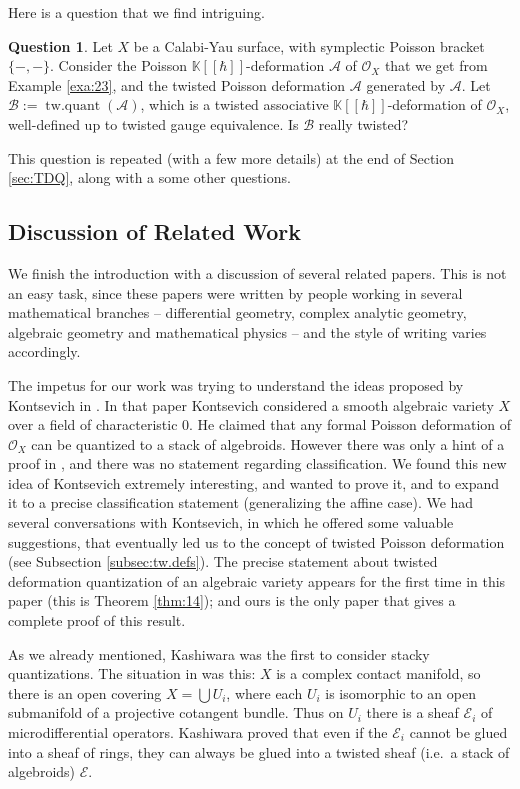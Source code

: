 \documentclass[a4paper, 10pt]{amsart}
\theoremstyle{definition}
\newtheorem{que}[equation]{Question}
\numberwithin{equation}{section}
\newcommand{\opn}{\operatorname}
\newcommand{\mcal}[1]{\mathcal{#1}}
\newcommand{\mbb}[1]{\mathbb{#1}}
\newcommand{\bsym}[1]{\boldsymbol{#1}}
\newcommand{\K}{\mbb{K}}
\newcommand{\OO}{\mcal{O}}
\newcommand{\gerbe}[1]{\bsym{\mcal{#1}}}
\begin{document}
Here is a question that we find intriguing. 

\begin{que}
Let $X$ be a Calabi-Yau surface, with symplectic Poisson bracket 
$\{ -,- \}$. Consider the Poisson $\K[[\hbar]]$-deformation 
$\mcal{A}$ of $\mcal{O}_X$ that we get from Example \ref{exa:23}, and the 
twisted Poisson deformation $\gerbe{A}$ generated by $\mcal{A}$.
Let $\gerbe{B} := \opn{tw{.}quant} (\gerbe{A})$,
which is a twisted associative $\K[[\hbar]]$-deformation 
of $\mcal{O}_X$, well-defined up to twisted gauge equivalence. Is
$\gerbe{B}$ really twisted? 
\end{que}

This question is repeated (with a few more details) at the end of Section
\ref{sec:TDQ}, along with a some other questions.


\subsection{Discussion of Related Work} \label{subsec:discuss}
We finish the introduction with a discussion of several related papers.
This is not an easy task, since these papers were written by people working in
several mathematical branches -- differential geometry, complex
analytic geometry, algebraic geometry and mathematical physics -- and the style
of writing varies accordingly.  

The impetus for our work was trying to understand the ideas 
proposed by Kontsevich in \cite{Ko2}. In that paper Kontsevich considered a
smooth algebraic variety $X$ over a field of characteristic $0$. He claimed
that any formal Poisson deformation of $\OO_X$ can be quantized to a stack of
algebroids. However there was only a hint of a proof in \cite{Ko2}, and there
was no statement regarding classification. We found this new idea of Kontsevich
extremely interesting, and wanted to prove it, and to expand it to a
precise classification statement (generalizing the affine case). We had several
conversations with Kontsevich, in which he offered some valuable suggestions,
that eventually led us to the concept of twisted Poisson deformation 
(see Subsection \ref{subsec:tw.defs}). The precise statement
about twisted deformation quantization of an
algebraic variety appears for the first time in this paper (this is 
Theorem \ref{thm:14}); and ours is the only paper that gives a complete proof
of this result. 

As we already mentioned, Kashiwara \cite{Ka} was the first to consider 
stacky quantizations. The situation in \cite{Ka} was this: $X$ is a complex
contact manifold, so
there is an open covering $X = \bigcup U_i$, where each $U_i$ is
isomorphic to an open submanifold of a projective cotangent bundle. Thus 
on $U_i$ there is a sheaf $\mcal{E}_i$ of microdifferential operators.
Kashiwara proved that even if the  $\mcal{E}_i$ cannot be glued into a
sheaf of rings, they can always be glued into a twisted sheaf (i.e.\
a stack of algebroids) $\gerbe{E}$. 
\end{document}
